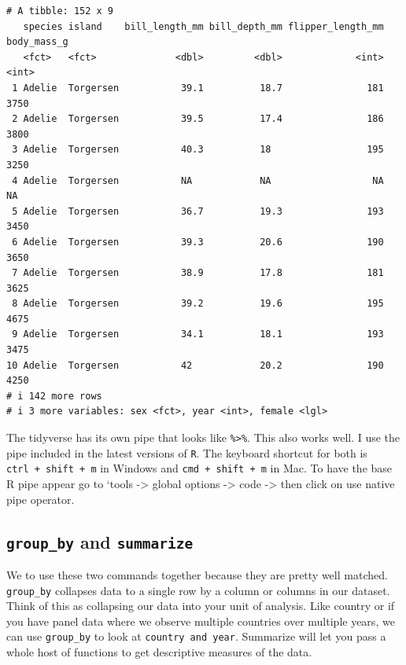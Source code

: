 \documentclass[
  letterpaper,
  DIV=11,
  numbers=noendperiod,
  oneside]{scrreprt}
\begin{document}
\begin{verbatim}
# A tibble: 152 x 9
   species island    bill_length_mm bill_depth_mm flipper_length_mm body_mass_g
   <fct>   <fct>              <dbl>         <dbl>             <int>       <int>
 1 Adelie  Torgersen           39.1          18.7               181        3750
 2 Adelie  Torgersen           39.5          17.4               186        3800
 3 Adelie  Torgersen           40.3          18                 195        3250
 4 Adelie  Torgersen           NA            NA                  NA          NA
 5 Adelie  Torgersen           36.7          19.3               193        3450
 6 Adelie  Torgersen           39.3          20.6               190        3650
 7 Adelie  Torgersen           38.9          17.8               181        3625
 8 Adelie  Torgersen           39.2          19.6               195        4675
 9 Adelie  Torgersen           34.1          18.1               193        3475
10 Adelie  Torgersen           42            20.2               190        4250
# i 142 more rows
# i 3 more variables: sex <fct>, year <int>, female <lgl>
\end{verbatim}

\begin{tcolorbox}[enhanced jigsaw, breakable, colback=white, left=2mm, bottomrule=.15mm, opacityback=0, toprule=.15mm, arc=.35mm, rightrule=.15mm, leftrule=.75mm]

The tidyverse has its own pipe that looks like
\texttt{\%\textgreater{}\%}. This also works well. I use the pipe
included in the latest versions of \texttt{R}. The keyboard shortcut for
both is \texttt{ctrl\ +\ shift\ +\ m} in Windows and
\texttt{cmd\ +\ shift\ +\ m} in Mac. To have the base R pipe appear go
to `tools -\textgreater{} global options -\textgreater{} code
-\textgreater{} then click on use native pipe operator.

\end{tcolorbox}

\hypertarget{group_by-and-summarize}{%
\subsection{\texorpdfstring{\texttt{group\_by} and
\texttt{summarize}}{group\_by and summarize}}\label{group_by-and-summarize}}

We to use these two commands together because they are pretty well
matched. \texttt{group\_by} collapses data to a single row by a column
or columns in our dataset. Think of this as collapsing our data into
your unit of analysis. Like country or if you have panel data where we
observe multiple countries over multiple years, we can use
\texttt{group\_by} to look at \texttt{country\ and\ year}. Summarize
will let you pass a whole host of functions to get descriptive measures
of the data.
\end{document}
